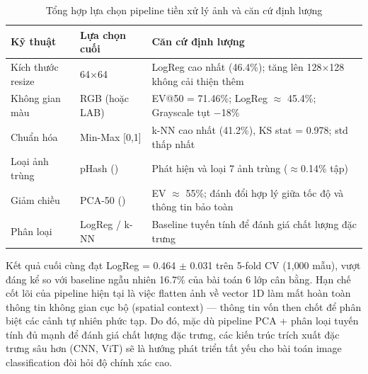 \begin{table}[H]
    \centering
    \small
    \begin{tabular}{|p{2.8cm}|p{3.5cm}|p{7cm}|}
        \hline
        \textbf{Kỹ thuật} & \textbf{Lựa chọn cuối}          & \textbf{Căn cứ định lượng}                                             \\
        \hline
        Kích thước resize & 64$\times$64                    & LogReg cao nhất (46.4\%); tăng lên 128$\times$128 không cải thiện thêm \\
        \hline
        Không gian màu    & RGB (hoặc LAB)                  & EV@50 = 71.46\%; LogReg $\approx$ 45.4\%; Grayscale tụt $-$18\%        \\
        \hline
        Chuẩn hóa         & Min-Max [0,1]                   & k-NN cao nhất (41.2\%), KS stat = 0.978; std thấp nhất                 \\
        \hline
        Loại ảnh trùng    & pHash (\cite{zauner2010phash})  & Phát hiện và loại 7 ảnh trùng ($\approx$0.14\% tập)                    \\
        \hline
        Giảm chiều        & PCA-50 (\cite{jolliffe2002pca}) & EV $\approx$ 55\%; đánh đổi hợp lý giữa tốc độ và thông tin bảo toàn   \\
        \hline
        Phân loại         & LogReg / k-NN                   & Baseline tuyến tính để đánh giá chất lượng đặc trưng                   \\
        \hline
    \end{tabular}
    \caption{Tổng hợp lựa chọn pipeline tiền xử lý ảnh và căn cứ định lượng}
    \label{tab:pipeline_conclusion}
\end{table}

Kết quả cuối cùng đạt LogReg = 0.464 $\pm$ 0.031 trên 5-fold CV (1{,}000 mẫu), vượt đáng kể so với baseline ngẫu nhiên 16.7\% của bài toán 6 lớp cân bằng. Hạn chế cốt lõi của pipeline hiện tại là việc flatten ảnh về vector 1D làm mất hoàn toàn thông tin không gian cục bộ (spatial context) --- thông tin vốn then chốt để phân biệt các cảnh tự nhiên phức tạp. Do đó, mặc dù pipeline PCA + phân loại tuyến tính đủ mạnh để đánh giá chất lượng đặc trưng, các kiến trúc trích xuất đặc trưng sâu hơn (CNN, ViT) sẽ là hướng phát triển tất yếu cho bài toán image classification đòi hỏi độ chính xác cao.
